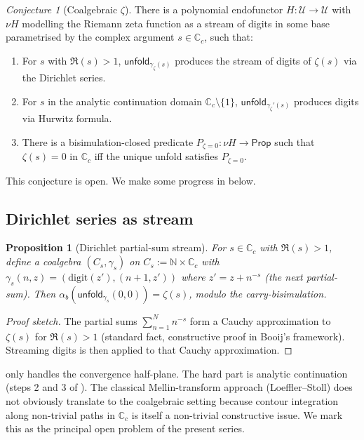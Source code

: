 \documentclass[12pt]{article}
\newtheorem{proposition}[theorem]{Proposition}
\theoremstyle{definition}
\theoremstyle{remark}
\newtheorem{conjecture}[theorem]{Conjecture}
\newcommand{\Type}{\mathcal{U}}
\newcommand{\N}{\mathbb{N}}
\newcommand{\unfold}{\mathsf{unfold}}
\begin{document}
\begin{conjecture}[Coalgebraic $\zeta$]\label{conj:zeta}
There is a polynomial endofunctor $H: \Type \to \Type$ with $\nu H$
modelling the Riemann zeta function as a stream of digits in some
base parametrised by the complex argument $s \in \mathbb{C}_c$,
such that:
\begin{enumerate}
\item For $s$ with $\Re(s) > 1$, $\unfold_{\gamma_\zeta(s)}$ produces
the stream of digits of $\zeta(s)$ via the Dirichlet series.
\item For $s$ in the analytic continuation domain $\mathbb{C}_c\setminus\{1\}$,
$\unfold_{\gamma_\zeta'(s)}$ produces digits via Hurwitz formula.
\item There is a bisimulation-closed predicate
$P_{\zeta=0}: \nu H \to \mathsf{Prop}$ such that $\zeta(s) = 0$
in $\mathbb{C}_c$ iff the unique unfold satisfies $P_{\zeta=0}$.
\end{enumerate}
\end{conjecture}

This conjecture is open. We make some progress in
 below.

\subsection{Dirichlet series as stream}

\begin{proposition}[Dirichlet partial-sum stream]\label{prop:dirichlet-stream}
For $s \in \mathbb{C}_c$ with $\Re(s) > 1$, define a coalgebra
$(C_s, \gamma_s)$ on $C_s := \N \times \mathbb{C}_c$ with
$\gamma_s(n, z) = (\mathrm{digit}(z'), (n+1, z'))$ where
$z' = z + n^{-s}$ (the next partial-sum). Then
$\alpha_b(\unfold_{\gamma_s}(0,0)) = \zeta(s)$, modulo
the carry-bisimulation.
\end{proposition}

\begin{proof}[Proof sketch]
The partial sums $\sum_{n=1}^N n^{-s}$ form a Cauchy approximation
to $\zeta(s)$ for $\Re(s) > 1$ (standard fact, constructive proof in
Booij's framework). Streaming digits is then  applied
to that Cauchy approximation.
\end{proof}

 only handles the convergence
half-plane. The hard part is analytic continuation (steps 2 and 3
of ). The classical Mellin-transform approach
(Loeffler--Stoll) does not obviously translate to the coalgebraic
setting because contour integration along non-trivial paths in
$\mathbb{C}_c$ is itself a non-trivial constructive issue. We
mark this as the principal open problem of the present series.
\end{document}
